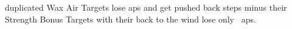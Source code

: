 
  {duplicated}%
  {Wax}%
  {Air}%
  {}%
  {Targets lose  \glspl{ap} and get pushed back  \glspl{step} minus their Strength Bonus}%
  {Targets with their back to the wind lose only
  \setcounter{track}{\value{spellPlusTwo}}%
  ~\glspl{ap}.}
